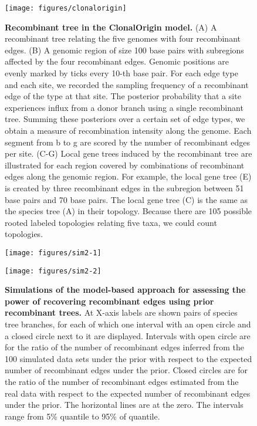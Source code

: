 \documentclass[12pt]{article}
\begin{document}
\begin{figure}[!ht]
\texttt{[image: figures/clonalorigin]}
\caption{
{\bf Recombinant tree in the ClonalOrigin model.}
(A) A recombinant tree relating the five genomes with four recombinant edges.
(B) A genomic region of size 100 base pairs with subregions affected by the
four recombinant edges. Genomic positions are evenly marked by ticks every 10-th
base pair.  For each edge type and each site, we recorded the sampling frequency
of a recombinant edge of the type at that site.  The posterior probability that
a site experiences influx from a donor branch using a single recombinant tree.
Summing these posteriors over a certain set of edge types, we obtain a measure
of recombination intensity along the genome.  Each segment from b to g are
scored by the number of recombinant edges per site.  (C-G) Local gene trees
induced by the recombinant tree are illustrated for each region covered by
combinations of recombinant edges along the genomic region. For example, the
local gene tree (E) is created by three recombinant edges in the subregion
between 51 base pairs and 70 base pairs. The local gene tree (C) is the same as
the species tree (A) in their topology.  Because there are 105 possible rooted
labeled topologies relating five taxa, we could count topologies.}
\label{fig:clonalorigin}
\end{figure}
\clearpage{}%


\begin{sidewaysfigure}

\texttt{[image: figures/sim2-1]}

\texttt{[image: figures/sim2-2]}

\caption{
{\bf Simulations of the model-based approach for assessing the power of
recovering recombinant edges using prior recombinant trees.} 
At X-axis labels are shown pairs of species tree branches, for each of which one
interval with an open circle and a closed circle next to it
are displayed.  Intervals with open circle are for 
the ratio of the number of recombinant edges inferred from the 100
simulated data sets under the prior with respect to the expected number of
recombinant edges under the prior.  Closed circles are for 
the ratio of the number of recombinant edges estimated
from the real data with respect to the expected number of recombinant edges
under the prior.  The horizontal lines are at the zero.  The intervals range
from 5\% quantile to 95\% of quantile.}
\label{fig:sim2}
\end{sidewaysfigure}
\clearpage{}%
\end{document}

